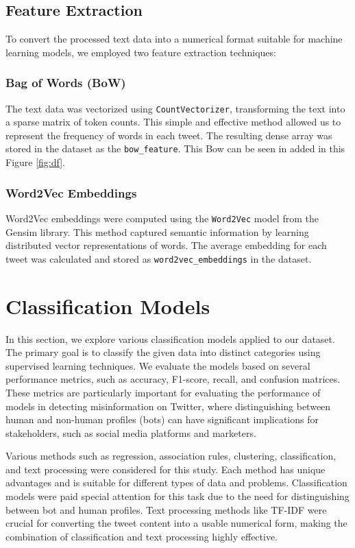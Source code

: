 \documentclass[a4paper,11pt]{article}
\begin{document}
\subsection{Feature Extraction}
To convert the processed text data into a numerical format suitable for machine learning models, we employed two feature extraction techniques:

\subsubsection{Bag of Words (BoW)}
The text data was vectorized using \texttt{CountVectorizer}, transforming the text into a sparse matrix of token counts. This simple and effective method allowed us to represent the frequency of words in each tweet. The resulting dense array was stored in the dataset as the \texttt{bow\_feature}. This Bow can be seen in added in this Figure \ref{fig:df}.

\subsubsection{Word2Vec Embeddings}
Word2Vec embeddings were computed using the \texttt{Word2Vec} model from the Gensim library. This method captured semantic information by learning distributed vector representations of words. The average embedding for each tweet was calculated and stored as \texttt{word2vec\_embeddings} in the dataset.








\section{Classification Models}

In this section, we explore various classification models applied to our dataset. The primary goal is to classify the given data into distinct categories using supervised learning techniques. We evaluate the models based on several performance metrics, such as accuracy, F1-score, recall, and confusion matrices. These metrics are particularly important for evaluating the performance of models in detecting misinformation on Twitter, where distinguishing between human and non-human profiles (bots) can have significant implications for stakeholders, such as social media platforms and marketers. 

Various methods such as regression, association rules, clustering, classification, and text processing were considered for this study. Each method has unique advantages and is suitable for different types of data and problems. Classification models were paid special attention for this task due to the need for distinguishing between bot and human profiles. Text processing methods like TF-IDF were crucial for converting the tweet content into a usable numerical form, making the combination of classification and text processing highly effective.
\end{document}
